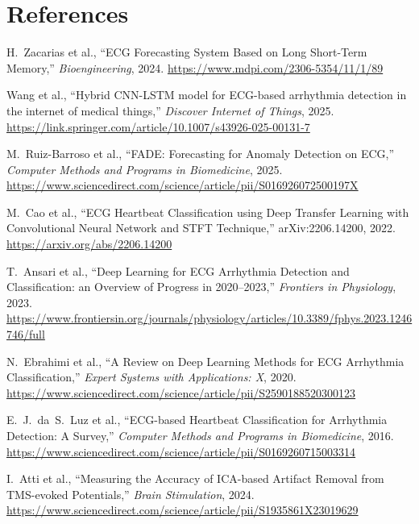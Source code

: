 \documentclass[11pt,a4paper]{article}
\begin{document}
\section*{References}
\begin{enumerate}[label={[\arabic*]},leftmargin=2.2em]
  \item \hypertarget{ref1}{}H.~Zacarias et al., ``ECG Forecasting System Based on Long
        Short-Term Memory,'' \emph{Bioengineering}, 2024.
        \url{https://www.mdpi.com/2306-5354/11/1/89}
  \item \hypertarget{ref2}{}Wang et al., ``Hybrid CNN-LSTM model for ECG-based arrhythmia
        detection in the internet of medical things,'' \emph{Discover Internet of Things},
        2025. \url{https://link.springer.com/article/10.1007/s43926-025-00131-7}
  \item \hypertarget{ref3}{}M.~Ruiz-Barroso et al., ``FADE: Forecasting for Anomaly Detection
        on ECG,'' \emph{Computer Methods and Programs in Biomedicine}, 2025.
        \url{https://www.sciencedirect.com/science/article/pii/S016926072500197X}
  \item \hypertarget{ref4}{}M.~Cao et al., ``ECG Heartbeat Classification using Deep Transfer
        Learning with Convolutional Neural Network and STFT Technique,'' arXiv:2206.14200,
        2022. \url{https://arxiv.org/abs/2206.14200}
  \item \hypertarget{ref5}{}T.~Ansari et al., ``Deep Learning for ECG Arrhythmia Detection and
        Classification: an Overview of Progress in 2020--2023,'' \emph{Frontiers in
        Physiology}, 2023.
        \url{https://www.frontiersin.org/journals/physiology/articles/10.3389/fphys.2023.1246746/full}
  \item \hypertarget{ref6}{}N.~Ebrahimi et al., ``A Review on Deep Learning Methods for ECG
        Arrhythmia Classification,'' \emph{Expert Systems with Applications: X}, 2020.
        \url{https://www.sciencedirect.com/science/article/pii/S2590188520300123}
  \item \hypertarget{ref7}{}E.~J.~da~S.~Luz et al., ``ECG-based Heartbeat Classification for
        Arrhythmia Detection: A Survey,'' \emph{Computer Methods and Programs in Biomedicine},
        2016. \url{https://www.sciencedirect.com/science/article/pii/S0169260715003314}
  \item \hypertarget{ref8}{}I.~Atti et al., ``Measuring the Accuracy of ICA-based Artifact
        Removal from TMS-evoked Potentials,'' \emph{Brain Stimulation}, 2024.
        \url{https://www.sciencedirect.com/science/article/pii/S1935861X23019629}
\end{enumerate}
\end{document}
